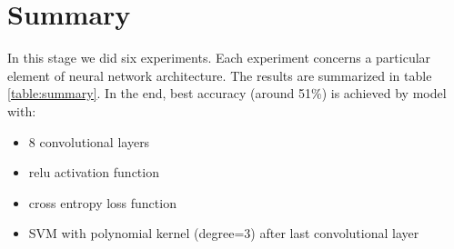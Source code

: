 \documentclass[a4paper]{article}
\begin{document}
\section{Summary}
In this stage we did six experiments. Each experiment concerns
a particular element of neural network architecture. The results are summarized in table \ref{table:summary}.
In the end, best accuracy (around 51\%) is achieved by model with:
\begin{itemize}
    \item 8 convolutional layers
    \item relu activation function
    \item cross entropy loss function
    \item SVM with polynomial kernel (degree=3) after last convolutional layer
\end{itemize}

\onecolumn
\end{document}
